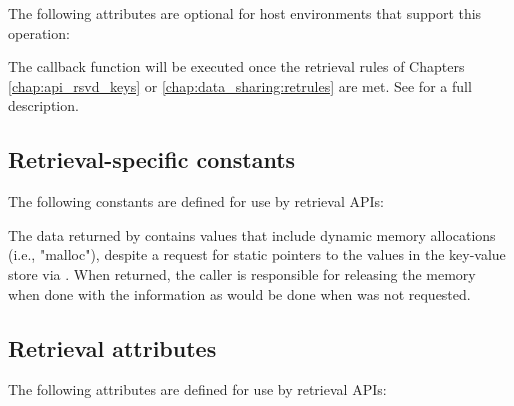 
\reqattrend

\optattrstart
The following attributes are optional for host environments that support this operation:


\optattrend

\descr

The callback function will be executed once the retrieval rules of Chapters \ref{chap:api_rsvd_keys} or \ref{chap:data_sharing:retrules} are met.
See  for a full description.


\subsection{Retrieval-specific constants}

The following constants are defined for use by retrieval \acp{API}:

\begin{constantdesc}
%
The data returned by  contains values that include dynamic memory allocations (i.e., "malloc"), despite a request for static pointers to the values in the key-value store via .  When returned, the caller is responsible for releasing the memory when done with the information as would be done when  was not requested.
%
\end{constantdesc}


\subsection{Retrieval attributes}
\label{chap:api_kg:attr}

The following attributes are defined for use by retrieval \acp{API}:

